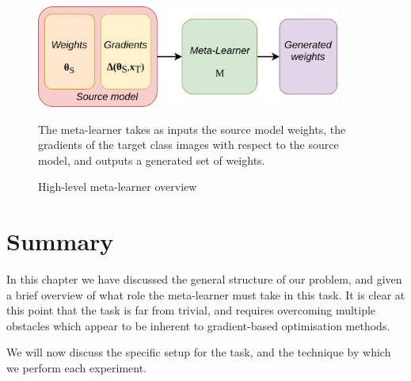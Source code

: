 \documentclass{report}
\begin{document}
\begin{figure}[!h]
 \centering
 \includegraphics[width=10cm]{ml-highlevel-overview}
 \caption{High-level meta-learner overview}
 The meta-learner takes as inputs the source model weights, the gradients of the target class images with respect to the source model, and outputs a generated set of weights.
 \label{fig:metalearnersimple:1}
\end{figure}

\section{Summary}
In this chapter we have discussed the general structure of our problem, and given a brief overview of what role the meta-learner must take in this task. It is clear at this point that the task is far from trivial, and requires overcoming multiple obstacles which appear to be inherent to gradient-based optimisation methods. \par
We will now discuss the specific setup for the task, and the technique by which we perform each experiment. \\
\end{document}
